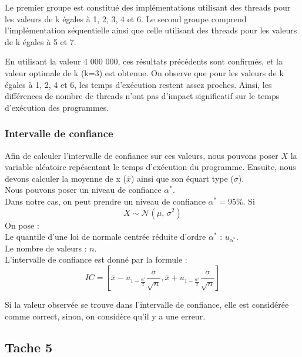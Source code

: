 \documentclass[
]{article}
\begin{document}
Le premier groupe est constitué des implémentations utilisant des
threads pour les valeurs de k égales à 1, 2, 3, 4 et 6. Le second groupe
comprend l'implémentation séquentielle ainsi que celle utilisant des
threads pour les valeurs de k égales à 5 et 7.

En utilisant la valeur 4 000 000, ces résultats précédents sont
confirmés, et la valeur optimale de k (k=3) est obtenue. On observe que
pour les valeurs de k égales à 1, 2, 4 et 6, les temps d'exécution
restent assez proches. Ainsi, les différences de nombre de threads n'ont
pas d'impact significatif sur le temps d'exécution des programmes.

\hypertarget{intervalle-de-confiance}{%
\subsubsection{Intervalle de confiance}\label{intervalle-de-confiance}}

Afin de calculer l'intervalle de confiance sur ces valeurs, nous pouvons
poser \(X\) la variable aléatoire repésentant le temps d'exécution du
programme. Ensuite, nous devons calculer la moyenne de x
(\(\overline{x}\)) ainsi que son équart type (\(\sigma\)).\\
Nous pouvons poser un niveau de confiance \(\alpha^{*}\).\\
Dans notre cas, on peut prendre un niveau de confiance
\(\alpha^{*} = 95\)\%. Si \[X \sim \mathcal{N}(\mu,\,\sigma^{2})\] On
pose :\\
Le quantile d'une loi de normale centrée réduite d'ordre \(\alpha^{*}\)
: \(u_{\alpha^{*}}\).\\
Le nombre de valeurs : \(n\).\\
L'intervalle de confiance est donné par la formule :\\
\begin{equation}
IC = [\overline{x} - u_{1- \frac{\alpha^{*}}{2}} \frac{\sigma}{\sqrt{n}} , \overline{x} + u_{1- \frac{\alpha^{*}}{2}} \frac{\sigma}{\sqrt{n}} ]
\end{equation}

Si la valeur observée se trouve dans l'intervalle de confiance, elle est
considérée comme correct, sinon, on considère qu'il y a une erreur.

\pagebreak

\hypertarget{tache-5}{%
\subsection{Tache 5}\label{tache-5}}
\end{document}
